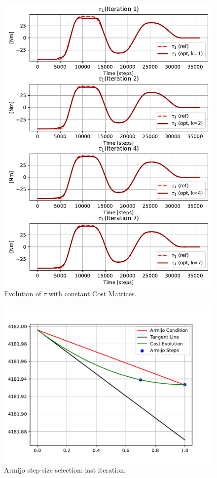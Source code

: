 \begin{figure}[htb]
    \centering
    \includegraphics[width=1\linewidth]{img/2-task2/tau_const.pdf}
    \caption{Evolution of $\tau$ with constant Cost Matrices.}
    \label{fig:tau_const_}
\end{figure}

\begin{figure}[htb]
    \centering
    \includegraphics[width=1\linewidth]{img/2-task2/Armijo_Last_Step_const.pdf}
    \caption{Armijo step-size selection: last iteration.}
    \label{fig:lastiter}
\end{figure}


